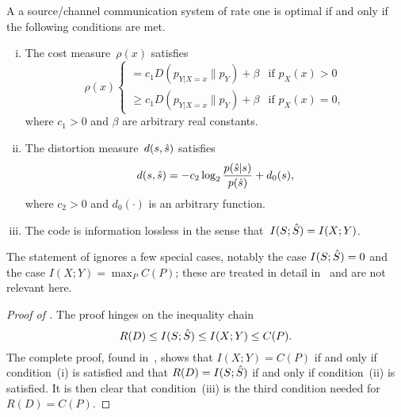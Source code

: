 \begin{theorem}
  \label{thm:tcntcbwmatch}
  A a source/channel communication system of rate one is optimal if and only if
  the following conditions are met.
  \begin{enumerate}[(i)]
    \item The cost measure~$\rho(x)$ satisfies
      \begin{equation}
        \label{eq:optcost}
        \rho(x)
        \begin{cases}
          = c_1 D(p_{Y|X=x} \| p_Y) + \beta & \text{if $p_X(x) > 0$} \\
          \ge c_1 D(p_{Y|X=x} \| p_Y) + \beta & \text{if $p_X(x) = 0$},
        \end{cases}
      \end{equation}
      where $c_1 > 0$ and $\beta$ are arbitrary real constants.

    \item The distortion measure~$d(s,{\hat{s}})$ satisfies
      \begin{equation}
        \label{eq:optdist}
        d(s,{\hat{s}}) = - c_2 \log_2 \frac{p({\hat{s}}|s)}{p({\hat{s}})} + d_0(s),
      \end{equation}
      where $c_2 > 0$ and $d_0(\cdot)$ is an arbitrary function.

    \item The code is information lossless in the sense that~$I(S;{\hat{S}}) =
      I(X;Y)$.
  \end{enumerate}
\end{theorem}

\begin{remark}
  \label{rem:tcntcrug}
  The statement of  ignores a few special cases,
  notably the case $I(S;{\hat{S}}) = 0$ and the case $I(X;Y) = \max_P C(P)$; these are
  treated in detail in~\cite{GastparRV2003} and are not relevant here.
\end{remark}

\begin{proof}[Proof of ]
  The proof hinges on the inequality chain
  \begin{equation*}
    R(D) \le I(S;{\hat{S}}) \le I(X;Y) \le C(P).
  \end{equation*}
  The complete proof, found in~\cite{GastparRV2003}, shows that $I(X;Y) = C(P)$
  if and only if condition~(i) is satisfied and that $R(D) = I(S;{\hat{S}})$ if and
  only if condition~(ii) is satisfied. It is then clear that condition~(iii) is
  the third condition needed for $R(D) = C(P)$.
\end{proof}

